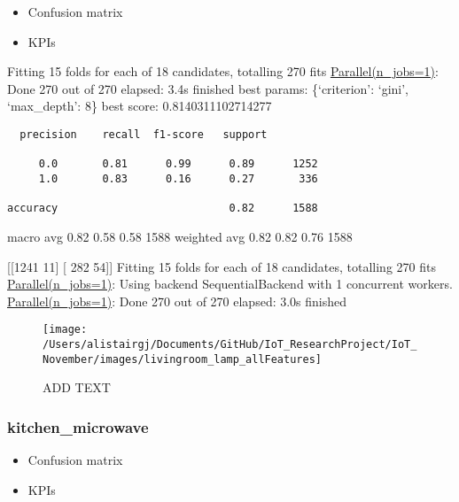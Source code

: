 \documentclass[11pt,]{article}
\providecommand{\tightlist}{%
  \setlength{\itemsep}{0pt}\setlength{\parskip}{0pt}}
\begin{document}
\begin{itemize}
\tightlist
\item
  Confusion matrix
\item
  KPIs
\end{itemize}

Fitting 15 folds for each of 18 candidates, totalling 270 fits
\href{Done\%20270\%20out\%20of\%20270\%20\%7C\%20elapsed:\%202.1s\%20finished}{Parallel(n\_jobs=1)}:
Done 270 out of 270 \textbar{} elapsed: 3.4s finished best params:
\{`criterion': `gini', `max\_depth': 8\} best score: 0.8140311102714277

\begin{verbatim}
  precision    recall  f1-score   support

     0.0       0.81      0.99      0.89      1252
     1.0       0.83      0.16      0.27       336

accuracy                           0.82      1588
\end{verbatim}

macro avg 0.82 0.58 0.58 1588 weighted avg 0.82 0.82 0.76 1588

{[}{[}1241 11{]} {[} 282 54{]}{]} Fitting 15 folds for each of 18
candidates, totalling 270 fits
\href{Done\%20270\%20out\%20of\%20270\%20\%7C\%20elapsed:\%202.1s\%20finished}{Parallel(n\_jobs=1)}:
Using backend SequentialBackend with 1 concurrent workers.
\href{Done\%20270\%20out\%20of\%20270\%20\%7C\%20elapsed:\%202.1s\%20finished}{Parallel(n\_jobs=1)}:
Done 270 out of 270 \textbar{} elapsed: 3.0s finished

\begin{figure}[H]

{\centering \texttt{[image: /Users/alistairgj/Documents/GitHub/IoT\_ResearchProject/IoT\_November/images/livingroom\_lamp\_allFeatures]} 

}

\caption{ADD TEXT}\label{fig:unnamed-chunk-14}
\end{figure}

\pagebreak

\hypertarget{kitchen_microwave}{%
\subsubsection{kitchen\_microwave}\label{kitchen_microwave}}

\begin{itemize}
\tightlist
\item
  Confusion matrix
\item
  KPIs
\end{itemize}
\end{document}
